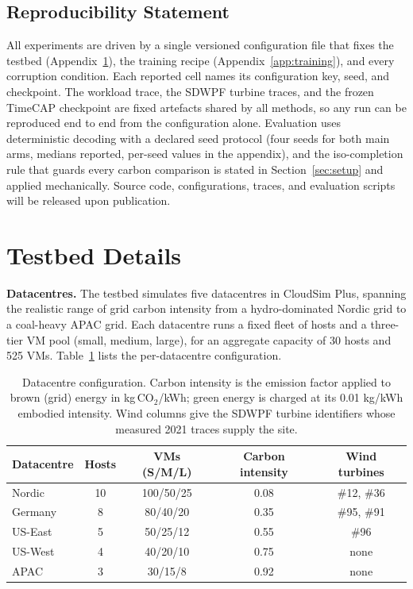 \documentclass{article} %
\begin{document}
\subsection*{Reproducibility Statement}
All experiments are driven by a single versioned configuration file that fixes the testbed (Appendix~\ref{app:testbed}), the training recipe (Appendix~\ref{app:training}), and every corruption condition. Each reported cell names its configuration key, seed, and checkpoint. The workload trace, the SDWPF turbine traces, and the frozen TimeCAP checkpoint are fixed artefacts shared by all methods, so any run can be reproduced end to end from the configuration alone. Evaluation uses deterministic decoding with a declared seed protocol (four seeds for both main arms, medians reported, per-seed values in the appendix), and the iso-completion rule that guards every carbon comparison is stated in Section~\ref{sec:setup} and applied mechanically. Source code, configurations, traces, and evaluation scripts will be released upon publication.
\newpage



\appendix
\section{Testbed Details}
\label{app:testbed}

\textbf{Datacentres.} The testbed simulates five datacentres in CloudSim Plus, spanning the realistic range of grid carbon intensity from a hydro-dominated Nordic grid to a coal-heavy APAC grid. Each datacentre runs a fixed fleet of hosts and a three-tier VM pool (small, medium, large), for an aggregate capacity of 30 hosts and 525 VMs. Table~\ref{tab:testbed} lists the per-datacentre configuration.

\begin{table}[ht]
\caption{Datacentre configuration. Carbon intensity is the emission factor applied to brown (grid) energy in kg\,CO$_2$/kWh; green energy is charged at its 0.01 kg/kWh embodied intensity. Wind columns give the SDWPF turbine identifiers whose measured 2021 traces supply the site.}
\label{tab:testbed}
\centering
\small
\begin{tabular*}{\linewidth}{@{\extracolsep{\fill}}lcccc@{}}
\toprule
Datacentre & Hosts & VMs (S/M/L) & Carbon intensity & Wind turbines \\
\midrule
Nordic  & 10 & 100/50/25 & 0.08 & \#12, \#36 \\
Germany & 8  & 80/40/20  & 0.35 & \#95, \#91 \\
US-East & 5  & 50/25/12  & 0.55 & \#96 \\
US-West & 4  & 40/20/10  & 0.75 & none \\
APAC    & 3  & 30/15/8   & 0.92 & none \\
\bottomrule
\end{tabular*}
\end{table}
\end{document}
